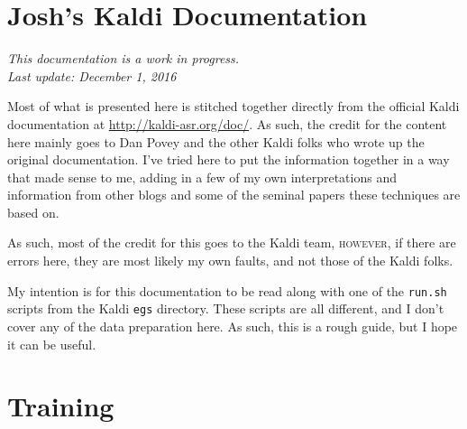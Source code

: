 \documentclass[10pt,a4paper]{article}
\begin{document}
\section*{\Large{Josh's Kaldi Documentation}}

\vspace{.25cm}

\begin{center}
\textit{This documentation is a work in progress.}\\
\textit{Last update: December 1, 2016}\\
\end{center}

\vspace{.25cm}

Most of what is presented here is stitched together directly from the official Kaldi documentation at \href{http://kaldi-asr.org/doc/}{http://kaldi-asr.org/doc/}. As such, the credit for the content here mainly goes to Dan Povey and the other Kaldi folks who wrote up the original documentation. I've tried here to put the information together in a way that made sense to me, adding in a few of my own interpretations and information from other blogs and some of the seminal papers these techniques are based on.  

As such, most of the credit for this goes to the Kaldi team, \textsc{however}, if there are errors here, they are most likely my own faults, and not those of the Kaldi folks.

My intention is for this documentation to be read along with one of the \texttt{run.sh} scripts from the Kaldi \texttt{egs} directory. These scripts are all different, and I don't cover any of the data preparation here. As such, this is a rough guide, but I hope it can be useful.

\vspace{1cm}

\section*{\large{Training}}
\end{document}

